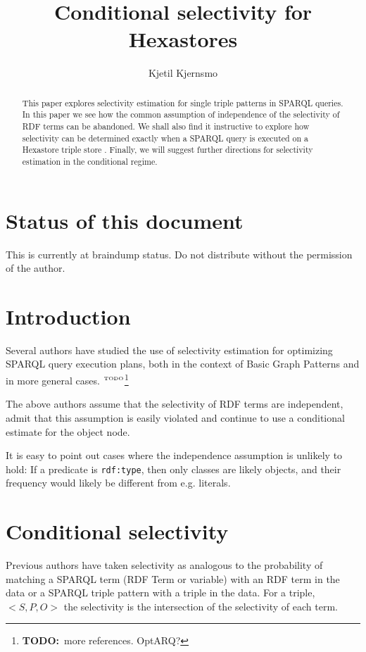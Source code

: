 \documentclass[12pt, draft]{article}
\title{Conditional selectivity for Hexastores}
\author{Kjetil Kjernsmo}
\newcommand{\rdfterm}[1]{\texttt{#1}}
\newcommand{\todo}[1]{\ensuremath{^{\textrm{\tiny{TODO}\normalsize}}}\footnote{\textbf{TODO:}~#1}}
\begin{document}
\maketitle

\section*{Status of this document}

This is currently at braindump status. Do not distribute without the
permission of the author.

\begin{abstract}
  This paper explores selectivity estimation for single triple
  patterns in SPARQL queries. In this paper we see how the common
  assumption of independence of the selectivity of RDF terms can be
  abandoned. We shall also find it instructive to explore how
  selectivity can be determined exactly when a SPARQL query is
  executed on a Hexastore triple store
  \cite{Weiss:2008:HSI:1453856.1453965}. Finally, we will suggest
  further directions for selectivity estimation in the conditional
  regime.

\end{abstract}

\section{Introduction}

Several authors have studied the use of selectivity estimation for
optimizing SPARQL query execution plans, both in the context of Basic
Graph Patterns \cite{Stocker:2008:SBG:1367497.1367578} and in more
general cases. \todo{more references. OptARQ?}

The above authors assume that the selectivity of RDF terms are
independent, admit that this assumption is easily violated and
continue to use a conditional estimate for the object node.

It is easy to point out cases where the independence assumption is
unlikely to hold: If a predicate is \rdfterm{rdf:type}, then only
classes are likely objects, and their frequency  would likely be
different from e.g. literals.

\section{Conditional selectivity}

Previous authors have taken selectivity as analogous to the
probability of matching a SPARQL term (RDF Term or variable) with an
RDF term in the data or a SPARQL triple pattern with a triple in the
data.  For a triple, $<S, P, O>$ the selectivity is the intersection
of the selectivity of each term.
\end{document}
